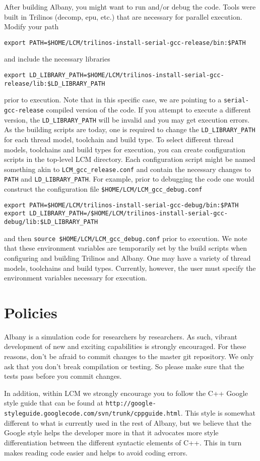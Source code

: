 \documentclass[10pt,a4paper]{article} \usepackage[utf8]{inputenc}
\begin{document}
After building Albany, you might want to run and/or debug the code.
Tools were built in Trilinos (decomp, epu, etc.) that are necessary
for parallel execution. Modify your path
\begin{verbatim}
export PATH=$HOME/LCM/trilinos-install-serial-gcc-release/bin:$PATH
\end{verbatim}
and include the necessary libraries
\begin{verbatim}
export LD_LIBRARY_PATH=$HOME/LCM/trilinos-install-serial-gcc-release/lib:$LD_LIBRARY_PATH
\end{verbatim}
prior to execution. Note that in this specific case, we are pointing
to a \verb+serial-gcc-release+ compiled version of the code.  If you
attempt to execute a different version, the \verb+LD_LIBRARY_PATH+
will be invalid and you may get execution errors. As the building
scripts are today, one is required to change the
\verb+LD_LIBRARY_PATH+ for each thread model, toolchain and build
type.  To select different thread models, toolchains and build types
for execution, you can create configuration scripts in the top-level LCM
directory. Each configuration script might be named something akin to
\verb+LCM_gcc_release.conf+ and contain the necessary changes to
\verb+PATH+ and \verb+LD_LIBRARY_PATH+. For example, prior to
debugging the code one would construct the configuration file
\verb+$HOME/LCM/LCM_gcc_debug.conf+
\begin{verbatim}
export PATH=$HOME/LCM/trilinos-install-serial-gcc-debug/bin:$PATH
export LD_LIBRARY_PATH=/$HOME/LCM/trilinos-install-serial-gcc-debug/lib:$LD_LIBRARY_PATH
\end{verbatim}
and then \verb+source $HOME/LCM/LCM_gcc_debug.conf+ prior to
execution. We note that these environment variables are temporarily
set by the build scripts when configuring and building Trilinos and
Albany. One may have a variety of thread models, toolchains and build
types. Currently, however, the user must specify the environment
variables necessary for execution.

\section{Policies}
Albany is a simulation code for researchers by researchers. As such,
vibrant development of new and exciting capabilities is strongly
encouraged. For these reasons, don't be afraid to commit changes to
the master git repository. We only ask that you don't break
compilation or testing. So please make sure that the tests pass before
you commit changes.

In addition, within LCM we strongly encourage you to follow the C++
Google style guide that can be found at
\verb+http://google-styleguide.googlecode.com/svn/trunk/cppguide.html+.
This style is somewhat different to what is currently used in the rest
of Albany, but we believe that the Google style helps the developer
more in that it advocates more style differentiation between the
different syntactic elements of C++. This in turn makes reading code
easier and helps to avoid coding errors.
\end{document}

